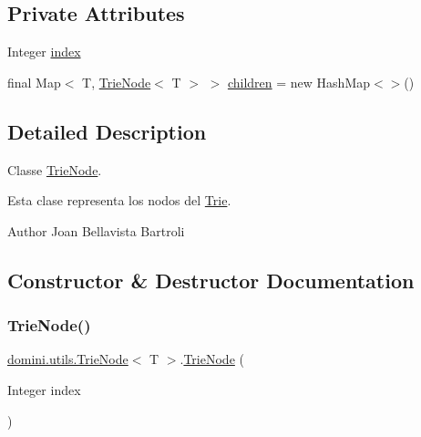 \subsection*{Private Attributes}
\begin{DoxyCompactItemize}
\item 
Integer \hyperlink{classdomini_1_1utils_1_1TrieNode_a9c247bc6568131e5e6ad0758adb67bfa}{index}
\item 
final Map$<$ T, \hyperlink{classdomini_1_1utils_1_1TrieNode}{Trie\+Node}$<$ T $>$ $>$ \hyperlink{classdomini_1_1utils_1_1TrieNode_ae64d9c12696f526eecb3ff15aa290640}{children} = new Hash\+Map$<$$>$()
\end{DoxyCompactItemize}


\subsection{Detailed Description}
Classe \hyperlink{classdomini_1_1utils_1_1TrieNode}{Trie\+Node}. 

Esta clase representa los nodos del \hyperlink{classdomini_1_1utils_1_1Trie}{Trie}.

\begin{DoxyAuthor}{Author}
Joan Bellavista Bartroli 
\end{DoxyAuthor}


\subsection{Constructor \& Destructor Documentation}
\mbox{\label{classdomini_1_1utils_1_1TrieNode_af9a18353151b5e3dea5966f50629319a}} 
\subsubsection{\texorpdfstring{Trie\+Node()}{TrieNode()}}
{\footnotesize\ttfamily \hyperlink{classdomini_1_1utils_1_1TrieNode}{domini.\+utils.\+Trie\+Node}$<$ T $>$.\hyperlink{classdomini_1_1utils_1_1TrieNode}{Trie\+Node} (\begin{DoxyParamCaption}\item[{Integer}]{index }\end{DoxyParamCaption})\hspace{0.3cm}{\ttfamily [inline]}}



